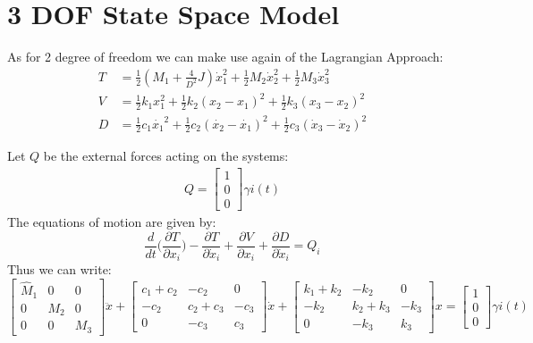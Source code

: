\section{3 DOF State Space Model}
As for 2 degree of freedom we can make use again of the Lagrangian Approach:
\begin{align}
T &= \frac{1}{2} (M_1 + \frac{4}{D^2}J)\dot{x}_1^2+\frac{1}{2}M_2\dot{x}_2^2 + \frac{1}{2}M_3 \dot{x}_3^2 \\
V &= \frac{1}{2}k_1x_1^2 + \frac{1}{2}k_2(x_2-x_1)^2 +\frac{1}{2}k_3 (x_3-x_2)^2\\
D &= \frac{1}{2}c_1\dot{x_1}^2 + \frac{1}{2}c_2(\dot{x_2}-\dot{x_1})^2 +\frac{1}{2}c_3(\dot{x}_3-\dot{x}_2)^2
\end{align}

Let $Q$ be the external forces acting on the systems:
\begin{align}
Q =\begin{bmatrix} 1 \\ 0 \\ 0 \end{bmatrix} \gamma i(t)
\end{align}
The equations of motion are given by:
\begin{equation}\frac{d}{dt}\Big(\frac{\partial T}{\partial x_i} \Big) -\frac{\partial T}{\partial \dot{x}_i} + \frac{\partial V}{\partial x_i} + \frac{\partial D}{\partial \dot{x}_i} = Q_i\end{equation}
Thus we can write:
\begin{equation}
\begin{bmatrix}
\hat{M}_1 & 0 & 0 \\
0 & M_2 & 0 \\
0 & 0 & M_3
\end{bmatrix}
\ddot{x} + 
\begin{bmatrix}
c_1+c_2 & -c_2 &0 \\
-c_2 & c_2+c_3 & -c_3 \\
0 & -c_3 & c_3
\end{bmatrix}
\dot{x}+
\begin{bmatrix}
k_1+k_2 & -k_2  &0\\
-k_2 & k_2+k_3 & -k_3 \\
0 & -k_3 & k_3
\end{bmatrix}
x = \begin{bmatrix} 1 \\ 0 \\ 0\end{bmatrix}\gamma i(t)\end{equation}
